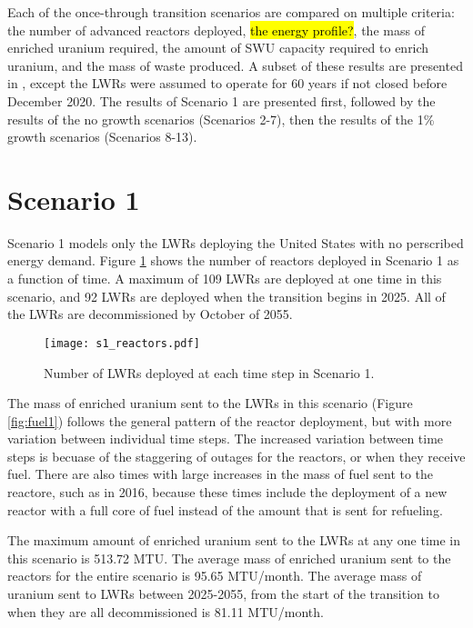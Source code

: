 
Each of the once-through transition scenarios are compared on multiple 
criteria: the number of advanced reactors deployed, \hl{the energy profile?}, 
the mass of enriched 
uranium required, the amount of \gls{SWU} capacity required to enrich uranium,
and the mass of waste produced. A subset of these results are presented
in \cite{bachmann_enrichment_2021}, except the \glspl{LWR} were assumed to 
operate for 60 years if not closed before December 2020. The results of Scenario 
1 are presented first, followed by the results of the no growth scenarios 
(Scenarios 2-7), then the results of the 1\% growth scenarios (Scenarios 8-13). 

\section{Scenario 1}
Scenario 1 models only the \glspl{LWR} deploying the United States with no 
perscribed energy demand. Figure \ref{fig:reactor1} shows the number of 
reactors deployed in Scenario 1 as a function of time. A maximum of 109 
\glspl{LWR} are deployed at one time in this scenario, and 92 \glspl{LWR}
are deployed when the transition begins in 2025. All of the \glspl{LWR} are
decommissioned by October of 2055. 

\begin{figure}
    \centering
    \texttt{[image: s1\_reactors.pdf]}
    \caption{Number of LWRs deployed at each time step in Scenario 1.}
    \label{fig:reactor1}
\end{figure}

The mass of enriched uranium sent to the \glspl{LWR} in this scenario (Figure 
\ref{fig:fuel1}) follows the general pattern of the reactor deployment, but with 
more variation between individual time steps. The increased variation between 
time steps is becuase of the staggering of outages for the reactors, or when 
they receive fuel. There are also times with large increases in the mass of fuel 
sent to the reactore, such as in 2016, because these times include the deployment 
of a new reactor with a full core of fuel instead of the amount that is 
sent for refueling. 

The maximum amount of enriched uranium sent to the \glspl{LWR} at any one 
time in this scenario is 513.72 MTU. The average mass of enriched uranium sent to 
the reactors for the entire scenario is 95.65 MTU/month. The average mass of 
uranium sent to \glspl{LWR} between 2025-2055, from the start of the transition 
to when they are all decommissioned is 81.11 MTU/month. 


